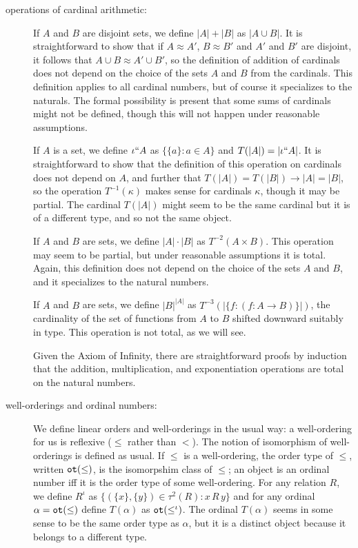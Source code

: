 \documentclass[12pt]{article}
\begin{document}
\begin{description}
\item[ operations of cardinal arithmetic:]  If $A$ and $B$ are disjoint sets, we define $|A|+|B|$ as $|A \cup B|$.  It is straightforward to show that if $A \approx A'$, $B \approx B'$ and $A'$ and $B'$ are disjoint, it follows that $A \cup B \approx A' \cup B'$, so the definition of addition of cardinals does not depend on the choice of the sets $A$ and $B$ from the cardinals.
This definition applies to all cardinal numbers, but of course it specializes to the naturals.   The formal possibility is present that some sums of cardinals might not be defined, though this will not happen under reasonable assumptions.

If $A$ is a set, we define $\iota``A$ as $\{\{a\}:a \in A\}$ and $T(|A|) = |\iota``A|$.  It is straightforward to show that the definition of this operation on cardinals does not depend on $A$, and further that $T(|A|) = T(|B|) \rightarrow |A|=|B|$, so the operation $T^{-1}(\kappa)$ makes sense for cardinals $\kappa$, though it may be partial.  The cardinal
$T(|A|)$ might seem to be the same cardinal but it is of a different type, and so not the same object.

If $A$ and $B$ are sets, we define $|A| \cdot |B|$ as $T^{-2}(A \times B)$.  This operation may seem to be partial, but under reasonable assumptions it is total.  Again, this definition does not depend on the choice of the sets $A$ and $B$, and it specializes to the natural numbers.

If $A$ and $B$ are sets, we define $|B|^{|A|}$ as $T^{-3}(|\{f:(f:A \rightarrow B)\}|)$, the cardinality of the set of functions from $A$ to $B$ shifted downward suitably in type.  This operation is not total, as we will see.

Given the Axiom of Infinity, there are straightforward proofs by induction that the addition, multiplication, and exponentiation operations are total on the natural numbers.

\item[well-orderings and ordinal numbers:]  We define linear orders and well-orderings in the usual way:  a well-ordering for us is reflexive ($\leq$ rather than $<$).  The notion of isomorphism of well-orderings is defined as usual.  If $\leq$ is a well-ordering, the order type of $\leq$, written ${\tt ot}(\leq)$, is the isomorpshim class of $\leq$;  an object is an ordinal number iff it is the order type of some well-ordering.  For any relation $R$, we define $R^{\iota}$ as $\{(\{x\},\{y\}) \in \tau^2(R):x \, R \, y\}$ and for any ordinal $\alpha ={\tt ot}(\leq)$ define $T(\alpha)$ as ${\tt ot}(\leq^\iota)$.  The ordinal $T(\alpha)$ seems in some sense to be the same order type as $\alpha$, but it is a distinct object because it belongs to a different type.


\end{description}
\end{document}
